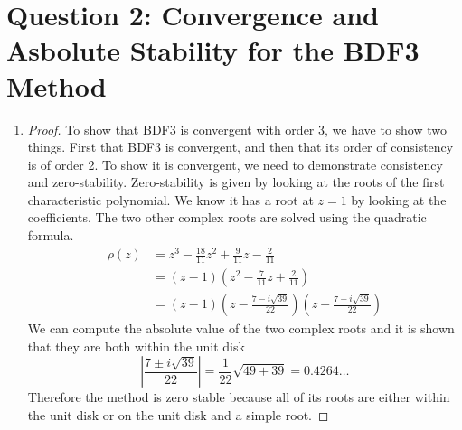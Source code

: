 \documentclass{article}
\begin{document}
\section*{Question 2: Convergence and Asbolute Stability for the BDF3 Method}

\begin{enumerate}[label=\alph*)]

  \item 
  \begin{proof}
    To show that BDF3 is convergent with order 3, we have to show two things.
    First that BDF3 is convergent, and then that its order of consistency is of
    order 2. 
    To show it is convergent, we need to demonstrate consistency and
    zero-stability. Zero-stability is given by looking at the roots of the first
    characteristic polynomial. We know it has a root at $z=1$ by looking at the
    coefficients. The two other complex roots are solved using the quadratic
    formula. 
    \begin{align*}
        \rho(z) &= z^3 - \frac{18}{11}z^2 + \frac{9}{11}z - \frac{2}{11}\\
                &= (z-1)\left(z^2 - \frac{7}{11}z + \frac{2}{11}\right)\\
                &= (z-1)\left(z - \frac{7 - i\sqrt{39}}{22}\right)\left(z -
                \frac{7 + i\sqrt{39}}{22}\right)
    \end{align*}
    We can compute the absolute value of the two complex roots and it is shown
    that they are both within the unit disk 
    \[
        \left|\frac{7 \pm i\sqrt{39}}{22}\right| = \frac{1}{22}\sqrt{49 + 39} =
        0.4264\ldots
    \]
    Therefore the method is zero stable because all of its roots are either
    within the unit disk or on the unit disk and a simple root. 


\end{proof}
\end{enumerate}
\end{document}
